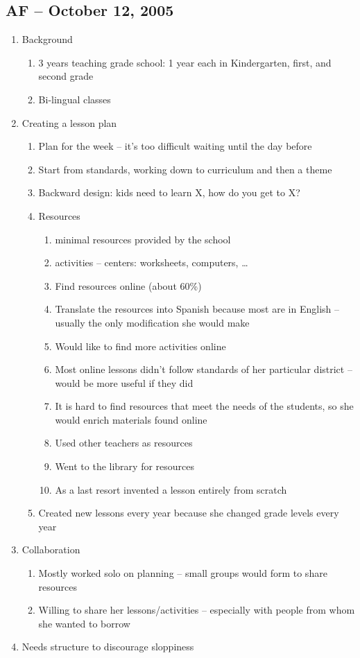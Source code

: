 \subsection{AF -- October 12, 2005}
\begin{enumerate}
	\item Background
		\begin{enumerate}
			\item 3 years teaching grade school: 1 year each in Kindergarten,
				first, and second grade
			\item Bi-lingual classes
		\end{enumerate}

	\item Creating a lesson plan
		\begin{enumerate}
			\item Plan for the week -- it's too difficult waiting until the day
				before
			\item Start from standards, working down to curriculum and then a
				theme
			\item Backward design: kids need to learn X, how do you get to X?
			\item Resources
				\begin{enumerate}
					\item minimal resources provided by the school
					\item activities -- centers: worksheets, computers, \ldots
					\item Find resources online (about 60\%)
					\item Translate the resources into Spanish because most
						are in English -- usually the only modification
						she would make
					\item Would like to find more activities online
					\item Most online lessons didn't follow standards of
						her particular district -- would be more useful
						if they did
					\item It is hard to find resources that meet the
						needs of the students, so she would enrich
						materials found online
					\item Used other teachers as resources
					\item Went to the library for resources
					\item As a last resort invented a lesson entirely from
						scratch
				\end{enumerate}
			\item Created new lessons every year because she changed grade
				levels every year
		\end{enumerate}
	\item Collaboration
		\begin{enumerate}
			\item Mostly worked solo on planning -- small groups would form to
				share resources
			\item Willing to share her lessons/activities -- especially with
				people from whom she wanted to borrow
		\end{enumerate}
	\item Needs structure to discourage sloppiness
\end{enumerate}

